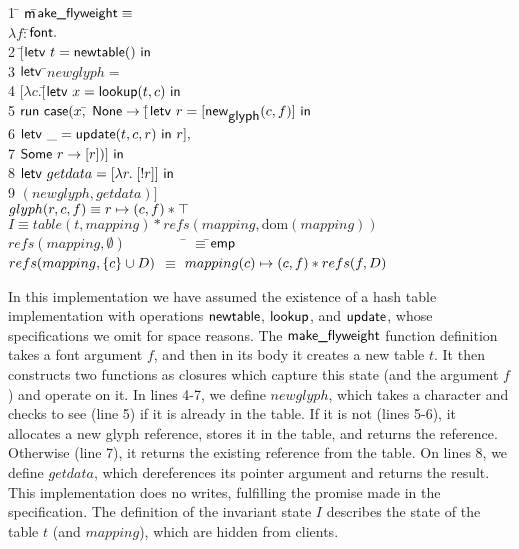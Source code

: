 \documentclass[preprint,natbib]{sigplanconf}
\begin{document}
{\small
\begin{tabbing}
1 \qquad \= $\mbox{\textsf{{m}}}$\=$\mbox{\textsf{{ake\_flyweight}}} \equiv$ \\
   \> \>     $\lambda f:$\=$\mbox{\textsf{{font}}}.\;$\\
2  \> \> $[$\=$\mbox{\textsf{{letv }}}t = \mbox{\textsf{{newtable}}}()\mbox{\textsf{{ in }}}$ \\
3  \> \> \> $\mbox{\textsf{{letv }}}$\=$newglyph =$ \\
4  \> \> \> \> \!\!$[\lambda c.[$\=$\mbox{\textsf{{letv }}}x = \mbox{\textsf{{lookup}}}(t, c)\mbox{\textsf{{ in}}}$\\
5  \> \> \>\>\> $\mbox{\textsf{{run }}}\mbox{\textsf{{case}}}(x,$\=
$\mbox{\textsf{{None}}} \to [$\=$\mbox{\textsf{{letv }}} r = [\mbox{\textsf{{new}}}_{\mbox{\textsf{{glyph}}}} (c,f)] \mbox{\textsf{{ in}}}$\\
6  \> \> \>\>\>\>\> $\mbox{\textsf{{letv }}} \_ = \mbox{\textsf{{update}}}(t, c, r) \mbox{\textsf{{ in }}}r],$ \\
7 \> \> \>\>\>\> $\mbox{\textsf{{Some }}}r \to [r])] \mbox{\textsf{{ in}}}$ \\
8 \> \> \> $\mbox{\textsf{{letv }}}getdata = [\lambda r.\; [!r]] \mbox{\textsf{{ in}}}$ \\
9 \> \> \> $(newglyph, getdata)]$
\\[0.5em]

$glyph(r, c, f) \equiv r \mapsto (c,f) * \top$ \\[0.5em]

$I \equiv table(t,mapping) * refs(mapping, \mbox{dom}(mapping))$ \\[0.5em]

$refs(mapping, \emptyset) \qquad\qquad  $ \= $\equiv$\;\;\=$\mathsf{emp}$ \\
$refs(mapping, \{{c}\} \cup D)$ \> $\equiv$\> $mapping(c) \mapsto (c,f) * refs(f, D)$ \\
 
\end{tabbing}
}

In this implementation we have assumed the existence of a hash table
implementation with operations $\mbox{\textsf{{newtable}}}$, $\mbox{\textsf{{lookup}}}$,
and $\mbox{\textsf{{update}}}$, whose specifications we omit for space
reasons. The $\mbox{\textsf{{make\_flyweight}}}$ function definition takes a
font argument $f$, and then in its body it creates a new table $t$. It
then constructs two functions as closures which capture this state
(and the argument $f$) and operate on it. In lines 4-7, we define
$newglyph$, which takes a character and checks to see (line 5) if it is
already in the table. If it is not (lines 5-6), it allocates a new
glyph reference, stores it in the table, and returns the
reference. Otherwise (line 7), it returns the existing reference from
the table.  On lines 8, we define $getdata$, which dereferences
its pointer argument and returns the result. This implementation does
no writes, fulfilling the promise made in the specification. The
definition of the invariant state $I$ describes the state of the table
$t$ (and $mapping$), which are hidden from clients.
\end{document}
